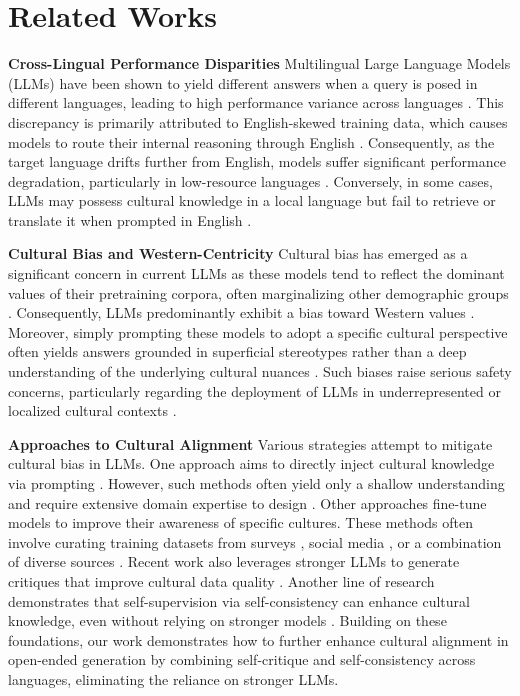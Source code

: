 \documentclass[11pt]{article}
\begin{document}
\section{Related Works}
\textbf{Cross-Lingual Performance Disparities}
Multilingual Large Language Models (LLMs) have been shown to yield different answers when a query is posed in different languages, leading to high performance variance across languages \citep{xuan-etal-2025-mmlu, bandarkar-etal-2024-belebele, ponti-etal-2020-xcopa}. This discrepancy is primarily attributed to English-skewed training data, which causes models to route their internal reasoning through English \citep{Weihua_Huang_Liu_Vangani_Zou_Tao_Wu_Aw_Chen_Lee_2026, schut2025multilingual, wendler-etal-2024-llamas}. Consequently, as the target language drifts further from English, models suffer significant performance degradation, particularly in low-resource languages \citep{huang-etal-2024-1}. Conversely, in some cases, LLMs may possess cultural knowledge in a local language but fail to retrieve or translate it when prompted in English \citep{myung2024blend}.


\textbf{Cultural Bias and Western-Centricity}
Cultural bias has emerged as a significant concern in current LLMs as these models tend to reflect the dominant values of their pretraining corpora, often marginalizing other demographic groups \citep{liattributing}. Consequently, LLMs predominantly exhibit a bias toward Western values \citep{mushtaq2025towards, liculture}. Moreover, simply prompting these models to adopt a specific cultural perspective often yields answers grounded in superficial stereotypes rather than a deep understanding of the underlying cultural nuances \citep{durmustowards}. Such biases raise serious safety concerns, particularly regarding the deployment of LLMs in underrepresented or localized cultural contexts \citep{azmi-etal-2025-indosafety}.


\textbf{Approaches to Cultural Alignment}
Various strategies attempt to mitigate cultural bias in LLMs. One approach aims to directly inject cultural knowledge via prompting \citep{wang-etal-2024-countries}. However, such methods often yield only a shallow understanding and require extensive domain expertise to design \citep{durmustowards, kovavc2023large}. Other approaches fine-tune models to improve their awareness of specific cultures. These methods often involve curating training datasets from surveys \citep{li2024culturellm}, social media \citep{shi-etal-2024-culturebank}, or a combination of diverse sources \citep{adilazuarda-etal-2025-surveys}. Recent work also leverages stronger LLMs to generate critiques that improve cultural data quality \citep{feng-etal-2025-culfit}. Another line of research demonstrates that self-supervision via self-consistency can enhance cultural knowledge, even without relying on stronger models \citep{wang-etal-2025-calm, zhang-etal-2025-cm}. Building on these foundations, our work demonstrates how to further enhance cultural alignment in open-ended generation by combining self-critique and self-consistency across languages, eliminating the reliance on stronger LLMs.
\end{document}
